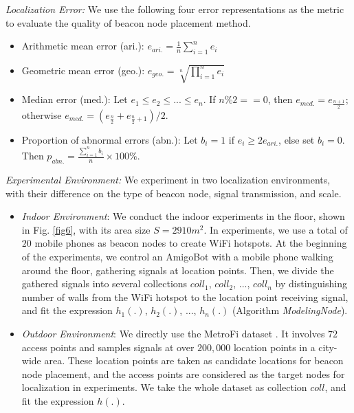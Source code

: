 \documentclass[10pt, conference, letterpaper]{IEEEtran}
\begin{document}
\emph{Localization Error:} We use the following four error representations as the metric to evaluate the quality of beacon node placement method.
\begin{itemize}
  \item Arithmetic mean error (ari.): $e_{ari.}=\frac{1}{n} \sum_{i=1}^{n} e_i$
  \iffalse
  \begin{equation} \label{s_ari}
  e_{ari.}=\frac{1}{n} \sum_{i=1}^{n} e_i
  \end{equation}
  \fi
  \item Geometric mean error (geo.): $e_{geo.}=\sqrt[n]{\prod_{i=1}^{n} e_i}$
  \item Median error (med.): Let $e_1 \leq e_2 \leq ... \leq e_n$. If $n\%2==0$, then $e_{med.}=e_{\frac{n+1}{2}}$; otherwise $e_{med.}=(e_{\frac{n}{2}}+e_{\frac{n}{2}+1})/2$.
  \item Proportion of abnormal errors (abn.): Let $b_i=1$ if $e_i \geq 2e_{ari.}$, else set $b_i=0$. Then $p_{abn.}=\frac{\sum_{i=1}^{n} b_i}{n} \times 100\%$.
\end{itemize}

\emph{Experimental Environment:} We experiment in two localization environments, with their difference on the type of beacon node, signal transmission, and scale.
\begin{itemize}
  \item \emph{Indoor Environment}: We conduct the indoor experiments in the floor, shown in Fig. \ref{fig6}, with its area size $S=2910m^2$. In experiments, we use a total of $20$ mobile phones as beacon nodes to create WiFi hotspots. At the beginning of the experiments, we control an AmigoBot with a mobile phone walking around the floor, gathering signals at location points. Then, we divide the gathered signals into several collections $coll_1$, $coll_2$, ..., $coll_n$ by distinguishing number of walls from the WiFi hotspot to the location point receiving signal, and fit the expression $h_1(.)$, $h_2(.)$, ..., $h_n(.)$ (Algorithm \textit{ModelingNode}).
  \item \emph{Outdoor Environment}: We directly use the MetroFi dataset \cite{MetroFi11}. It involves $72$ access points and samples signals at over $200,000$ location points in a city-wide area. These location points are taken as candidate locations for beacon node placement, and the access points are considered as the target nodes for localization in experiments. We take the whole dataset as collection $coll$, and fit the expression $h(.)$.
\end{itemize}
\end{document}
